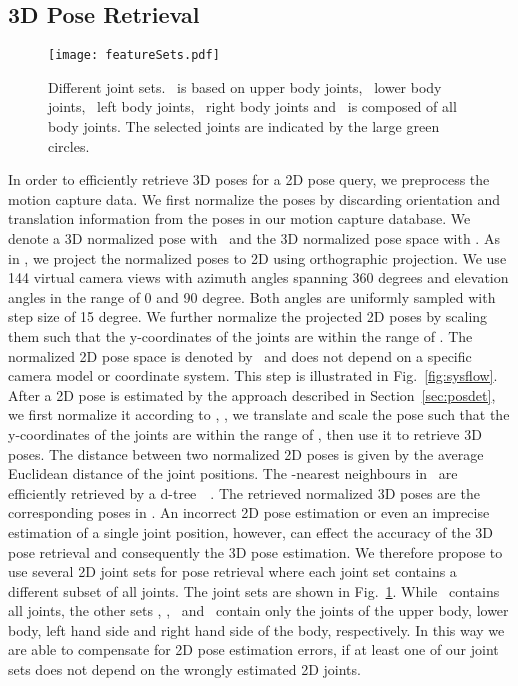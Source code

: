 \documentclass[10pt,twocolumn,letterpaper]{article}
\newcommand{\kdtree}{d-tree~}
\newcommand{\nspacet}{\mbox{}}
\newcommand{\nspace}{\mbox{}}
\newcommand{\fdup}{\mbox{}}
\newcommand{\fdlw}{\mbox{}}
\newcommand{\fdlt}{\mbox{}}
\newcommand{\fdrt}{\mbox{}}
\newcommand{\fdps}{\mbox{}}
\begin{document}
\subsection{3D Pose Retrieval}\label{sec:similarity}
\begin{figure}
\begin{center}
\texttt{[image: featureSets.pdf]}
\end{center}
   \caption{Different joint sets. \fdup~is based on upper body joints, \fdlw~lower body joints, \fdlt~left body joints, \fdrt~right body joints and \fdps~is composed of all body joints. The selected joints are indicated by the large green circles. 
   }
\label{fig:features}
\end{figure}
In order to efficiently retrieve 3D poses for a 2D pose query, we preprocess the motion capture data. We first normalize the poses by discarding orientation and translation information from the poses in our motion capture database. We denote a 3D normalized pose with \ptdn~and the 3D normalized pose space with \nspacet. As in \cite{yasin-2013}, we project the normalized poses  to 2D using orthographic projection. We use 144 virtual camera views with azimuth angles spanning 360 degrees and elevation angles in the range of 0 and 90 degree. Both angles are uniformly sampled with step size of 15 degree. We further normalize the projected 2D poses by scaling them such that the y-coordinates of the joints are within the range of . The normalized 2D pose space is denoted by \nspace\ and does not depend on a specific camera model or coordinate system. This step is illustrated in Fig.~\ref{fig:sysflow}. After a 2D pose is estimated by the approach described in Section~\ref{sec:posdet}, we first normalize it according to \nspace, \ie, we translate and scale the pose such that the y-coordinates of the joints are within the range of ,  then use it to retrieve 3D poses. The distance between two normalized 2D poses is given by the average Euclidean distance of the joint positions. The -nearest neighbours in \nspace\ are efficiently retrieved by a \kdtree~\cite{krueger-2010}. The retrieved normalized 3D poses are the corresponding poses in \nspacet. An incorrect 2D pose estimation or even an imprecise estimation of a single joint position, however, can effect the accuracy of the 3D pose retrieval and consequently the 3D pose estimation. We therefore propose to use several 2D joint sets for pose retrieval where each joint set contains a different subset of all joints. The joint sets are shown in Fig.~\ref{fig:features}. While \fdps\ contains all joints, the other sets \fdup, \fdlw, \fdlt\ and \fdrt\ contain only the joints of the upper body, lower body, left hand side and right hand side of the body, respectively. In this way we are able to compensate for 2D pose estimation errors, if at least one of our joint sets does not depend on the wrongly estimated 2D joints.
\end{document}
